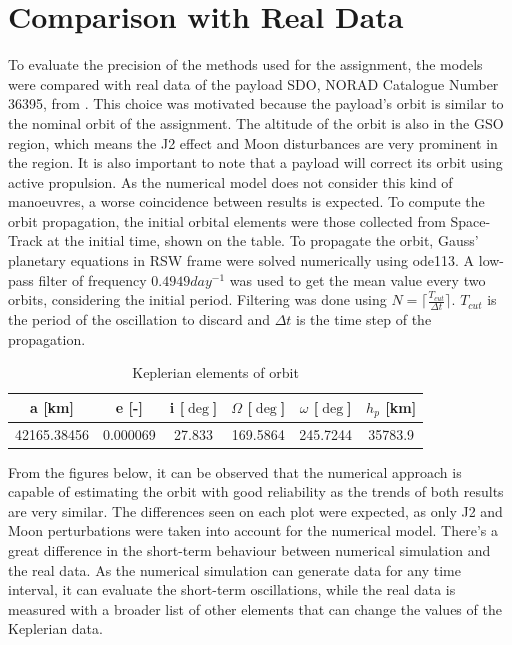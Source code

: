 \section{Comparison with Real Data}
\label{sec:comparison}

To evaluate the precision of the methods used for the assignment, the models were compared with real data of the payload SDO, NORAD Catalogue Number 36395, from \cite{space_track} \cite{n2yo}. This choice was motivated because the payload’s orbit is similar to the nominal orbit of the assignment. The altitude of the orbit is also in the GSO region, which means the J2 effect and Moon disturbances are very prominent in the region. It is also important to note that a payload will correct its orbit using active propulsion. As the numerical model does not consider this kind of manoeuvres, a worse coincidence between results is expected. To compute the orbit propagation, the initial orbital elements were those collected from Space-Track at the initial time, shown on the table. To propagate the orbit, Gauss’ planetary equations in RSW frame were solved numerically using ode113. A low-pass filter of frequency $0.4949  day^{-1}$ was used to get the mean value every two orbits, considering the initial period. Filtering was done using \( N = \lceil \frac{T_{cut}}{\Delta t} \rceil \). \( T_{cut} \) is the period of the oscillation to discard and \( \Delta t \) is the time step of the propagation. 


\begin{table}[ht]
	\centering
	\label{tab:keplerian_elements_2}
	\begin{tabular}{|c|c|c|c|c|c|}
		\hline
		a [km] & e [-] & i [$\deg$] & $\Omega$ [$\deg$] & $\omega$ [$\deg$] & $h_p$ [km] \\
		\hline
		42165.38456 & 0.000069 & 27.833 & 169.5864 & 245.7244 & 35783.9 \\
		\hline
	\end{tabular}
	\caption{Keplerian elements of orbit}
\end{table}

From the figures below, it can be observed that the numerical approach is capable of estimating the orbit with good reliability as the trends of both results are very similar. The differences seen on each plot were expected, as only J2 and Moon perturbations were taken into account for the numerical model. There’s a great difference in the short-term behaviour between numerical simulation and the real data. As the numerical simulation can generate data for any time interval, it can evaluate the short-term oscillations, while the real data is measured with a broader list of other elements that can change the values of the Keplerian data.

